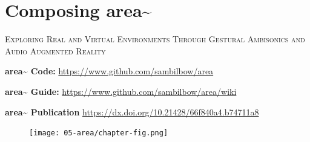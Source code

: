 \chapter{Composing area\textasciitilde{}}\label{sec: area}
\begin{flushright}
    \Large\textsc{Exploring Real and Virtual Environments Through Gestural Ambisonics and Audio Augmented Reality}
\end{flushright}
\begin{SingleSpace}
    \noindent \textbf{area\textasciitilde{} Code:}        \url{https://www.github.com/sambilbow/area}

    \noindent \textbf{area\textasciitilde{} Guide:}       \url{https://www.github.com/sambilbow/area/wiki}

    \noindent \textbf{area\textasciitilde{} Publication } \url{https://dx.doi.org/10.21428/66f840a4.b74711a8}
\end{SingleSpace}

\begin{figure}
    \centering
    \texttt{[image: 05-area/chapter-fig.png]}
    \captionsetup{labelformat=empty}
    \caption[\autoref{sec: area}: \textit{area\textasciitilde{}} in use, (from \citeauthor{bilbow2021a}, \citeyear{bilbow2021a})]{}
\end{figure}

